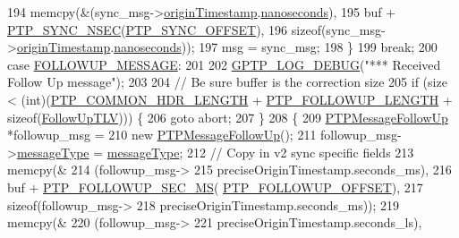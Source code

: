 \begin{DoxyCode}
{{{{{{194             memcpy(&(sync\_msg->\hyperlink{class_p_t_p_message_sync_a57a4bfcce938833de582c2ed5138aa3b}{originTimestamp}.\hyperlink{class_timestamp_a78ae11d98fcfe738239d0a853d82c84a}{nanoseconds}),
195                    buf + \hyperlink{avbts__message_8hpp_af15f1cc9fd51ec5b1b4bd604f70292d0}{PTP\_SYNC\_NSEC}(\hyperlink{avbts__message_8hpp_a6306aedd2fe6dbaf36910d15e9dadbfd}{PTP\_SYNC\_OFFSET}),
196                    \textcolor{keyword}{sizeof}(sync\_msg->\hyperlink{class_p_t_p_message_sync_a57a4bfcce938833de582c2ed5138aa3b}{originTimestamp}.\hyperlink{class_timestamp_a78ae11d98fcfe738239d0a853d82c84a}{nanoseconds}));
197             msg = sync\_msg;
198         \}
199         \textcolor{keywordflow}{break};
200     \textcolor{keywordflow}{case} \hyperlink{avbts__message_8hpp_ac6606ebe91c8ac66a2c314c79f5ab013a9a003449758340b855b445c50b6c3b0d}{FOLLOWUP\_MESSAGE}:
201 
202         \hyperlink{gptp__log_8hpp_ae4c6efe7c9cf6d7d3bbd28a0fd087d61}{GPTP\_LOG\_DEBUG}(\textcolor{stringliteral}{"*** Received Follow Up message"});
203 
204         \textcolor{comment}{// Be sure buffer is the correction size}
205         \textcolor{keywordflow}{if} (size < (\textcolor{keywordtype}{int})(\hyperlink{avbts__message_8hpp_a8ec4d965b7b1e83844f1c17f12e9b8e4}{PTP\_COMMON\_HDR\_LENGTH} + 
      \hyperlink{avbts__message_8hpp_a7db8f880133691145b633e681fea9d27}{PTP\_FOLLOWUP\_LENGTH} + \textcolor{keyword}{sizeof}(\hyperlink{class_follow_up_t_l_v}{FollowUpTLV}))) \{
206             \textcolor{keywordflow}{goto} abort;
207         \}
208         \{
209             \hyperlink{class_p_t_p_message_follow_up}{PTPMessageFollowUp} *followup\_msg =
210                 \textcolor{keyword}{new} \hyperlink{class_p_t_p_message_follow_up}{PTPMessageFollowUp}();
211             followup\_msg->\hyperlink{class_p_t_p_message_common_adb32627aa5b0e2dbad3ccd88aab07c05}{messageType} = \hyperlink{class_p_t_p_message_common_adb32627aa5b0e2dbad3ccd88aab07c05}{messageType};
212             \textcolor{comment}{// Copy in v2 sync specific fields}
213             memcpy(&
214                    (followup\_msg->
215                 preciseOriginTimestamp.seconds\_ms),
216                    buf + \hyperlink{avbts__message_8hpp_a8bc5c60f52c4f491a6e86c43ec5ddc66}{PTP\_FOLLOWUP\_SEC\_MS}(
      \hyperlink{avbts__message_8hpp_af54dd338e8c2b906b028746fbecdb74d}{PTP\_FOLLOWUP\_OFFSET}),
217                    \textcolor{keyword}{sizeof}(followup\_msg->
218                       preciseOriginTimestamp.seconds\_ms));
219             memcpy(&
220                    (followup\_msg->
221                 preciseOriginTimestamp.seconds\_ls),
}}}}}}
\end{DoxyCode}
